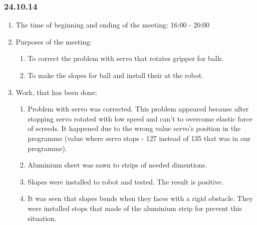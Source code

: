 
\subsubsection{24.10.14}

\begin{enumerate}
	\item The time of beginning and ending of the meeting:
	16:00 - 20:00
	\item Purposes of the meeting:
	\begin{enumerate}
	  \item To correct the problem with servo that rotates gripper for balls.
	  
	  \item To make the slopes for ball and install their at the robot.
	  
    \end{enumerate}
    
	\item Work, that has been done:
	\begin{enumerate}
	  \item Problem with servo was corrected. This problem appeared because after stopping servo rotated with low speed and can't to overcome elastic force of screeds. It happened due to the wrong value servo's position in the programme (value where servo stops - 127 instead of 135 that was in our programme).
      
      \item Aluminium sheet was sawn to strips of needed dimentions.
      
      \item Slopes were installed to robot and tested. The result is positive.
      
      \item It was seen that slopes bends when they faces with a rigid obstacle. They were installed stops that made of the aluminium strip for prevent this situation.
      

\end{enumerate}
\end{enumerate}
